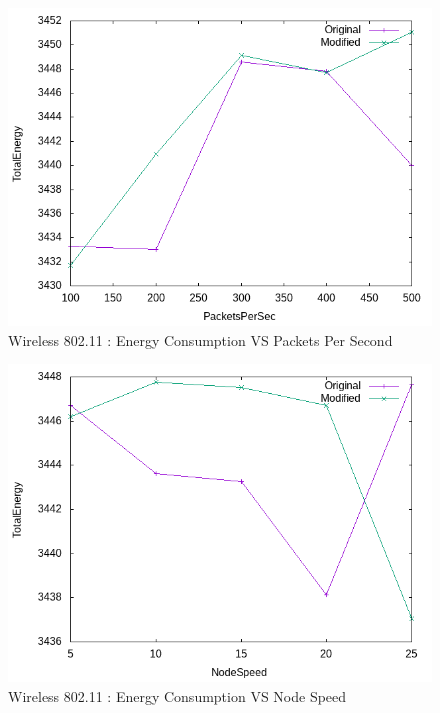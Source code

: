     \begin{figure}[!h] 
        \centering
        \includegraphics[width=.9\textwidth]{Pictures/Wireless802.11Mobile/Combined/TotalEnergyVSPacketsPerSec.png}
         \caption{Wireless 802.11 : Energy Consumption VS Packets Per Second}
    \end{figure}
    
    \begin{figure}[!h] 
        \centering
        \includegraphics[width=.9\textwidth]{Pictures/Wireless802.11Mobile/Combined/TotalEnergyVSNodeSpeed.png}
         \caption{Wireless 802.11 : Energy Consumption VS Node Speed}
    \end{figure}



\newpage
